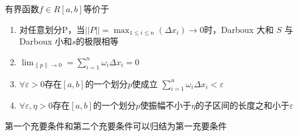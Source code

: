 \documentclass[lang=cn,12pt]{elegantbook}
\begin{document}
\begin{theorem}[Riemann可积的充要条件]
    有界函数$f \in R[a,b] $等价于
    \begin{enumerate}
    \item  对任意划分P，当$||P|| = \max_{1 \leq i \leq n}(\Delta x_i) \to 0$时，Darboux 大和 $S$ 与 Darboux 小和$s$的极限相等
    \item  $\lim_{\|p\| \to 0} = \sum_{i=1}^n \omega_i \Delta x_i = 0$
    \item $ \forall \varepsilon > 0 $存在$[a,b]$的一个划分$p$使成立 $ \sum_{i=1}^n \omega_i \Delta x_i  < \varepsilon $
    \item  $\forall \varepsilon, \eta  > 0 $存在$[a,b]$的一个划分$p$使振幅不小于$\eta$的子区间的长度之和小于$\varepsilon$
\end{enumerate}
\end{theorem}

第一个充要条件和第二个充要条件可以归结为第一充要条件
\end{document}
